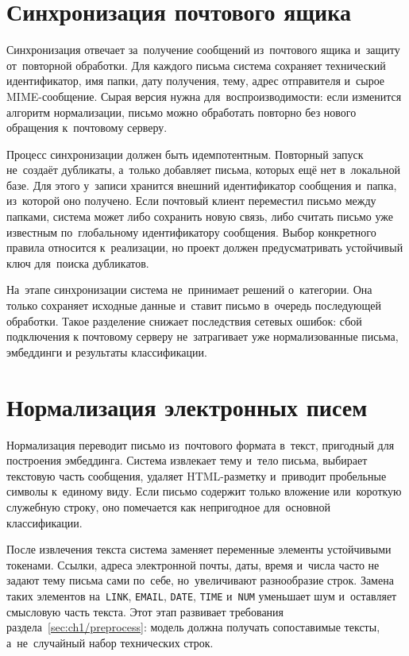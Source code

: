 \section{Синхронизация почтового ящика}\label{sec:ch2/sync}

Синхронизация отвечает за~получение сообщений из~почтового ящика и~защиту
от~повторной обработки. Для каждого письма система сохраняет технический
идентификатор, имя папки, дату получения, тему, адрес отправителя и~сырое
MIME-сообщение. Сырая версия нужна для~воспроизводимости: если изменится
алгоритм нормализации, письмо можно обработать повторно без нового обращения
к~почтовому серверу.

Процесс синхронизации должен быть идемпотентным. Повторный запуск не~создаёт
дубликаты, а~только добавляет письма, которых ещё нет в~локальной базе. Для
этого у~записи хранится внешний идентификатор сообщения и~папка, из~которой оно
получено. Если почтовый клиент переместил письмо между папками, система может
либо сохранить новую связь, либо считать письмо уже известным по~глобальному
идентификатору сообщения. Выбор конкретного правила относится к~реализации, но
проект должен предусматривать устойчивый ключ для~поиска дубликатов.

На~этапе синхронизации система не~принимает решений о~категории. Она только
сохраняет исходные данные и~ставит письмо в~очередь последующей обработки.
Такое разделение снижает последствия сетевых ошибок: сбой подключения к
почтовому серверу не~затрагивает уже нормализованные письма, эмбеддинги и
результаты классификации.

\section{Нормализация электронных писем}\label{sec:ch2/normalization}

Нормализация переводит письмо из~почтового формата в~текст, пригодный для
построения эмбеддинга. Система извлекает тему и~тело письма, выбирает
текстовую часть сообщения, удаляет HTML-разметку и~приводит пробельные символы
к~единому виду. Если письмо содержит только вложение или~короткую служебную
строку, оно помечается как непригодное для~основной классификации.

После извлечения текста система заменяет переменные элементы устойчивыми
токенами. Ссылки, адреса электронной почты, даты, время и~числа часто не
задают тему письма сами по~себе, но~увеличивают разнообразие строк. Замена
таких элементов на~\texttt{LINK}, \texttt{EMAIL}, \texttt{DATE},
\texttt{TIME} и~\texttt{NUM} уменьшает шум и~оставляет смысловую часть текста.
Этот этап развивает требования раздела~\ref{sec:ch1/preprocess}: модель должна
получать сопоставимые тексты, а~не~случайный набор технических строк.


